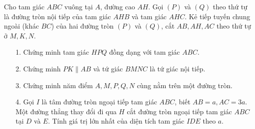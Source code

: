 \begin{ex}%
    Cho tam giác $ABC$ vuông tại $A$, đường cao $AH$. Gọi $(P)$ và $(Q)$ theo thứ tự là đường tròn nội tiếp của tam giác $AHB$ và tam giác $AHC$. Kẻ tiếp tuyến chung ngoài (khác $BC$) của hai đường tròn $(P)$ và $(Q)$, cắt $AB,AH,AC$ theo thứ tự ở $M,K,N$.
    \begin{enumerate}
    \item[1.] Chứng minh tam giác $HPQ$ đồng dạng với tam giác $ABC$.
    \item[2.] Chứng minh $PK\parallel AB$ và tứ giác $BMNC$ là tứ giác nội tiếp.
    \item[3.] Chứng minh năm điểm $A,M,P,Q,N$ cùng nằm trên một đường tròn.
    \item[4.] Gọi $I$ là tâm đường tròn ngoại tiếp tam giác $ABC$, biết $AB=a,AC=3a$. Một đường thẳng thay đổi đi qua $H$ cắt đường tròn ngoại tiếp tam giác $ABC$ tại $D$ và $E$. Tính giá trị lớn nhất của diện tích tam giác $IDE$ theo $a$.
    \end{enumerate}
\loigiai
    {
   \begin{center}
\end{center}}
\end{ex}
